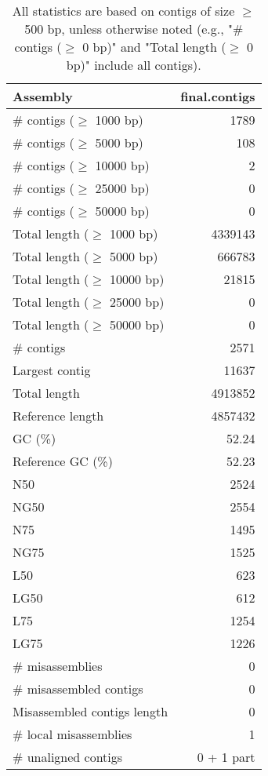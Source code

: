 \documentclass[12pt,a4paper]{article}
\begin{document}
\begin{table}[ht]
\begin{center}
\caption{All statistics are based on contigs of size $\geq$ 500 bp, unless otherwise noted (e.g., "\# contigs ($\geq$ 0 bp)" and "Total length ($\geq$ 0 bp)" include all contigs).}
\begin{tabular}{|l*{1}{|r}|}
\hline
Assembly & final.contigs \\ \hline
\# contigs ($\geq$ 1000 bp) & 1789 \\ \hline
\# contigs ($\geq$ 5000 bp) & 108 \\ \hline
\# contigs ($\geq$ 10000 bp) & 2 \\ \hline
\# contigs ($\geq$ 25000 bp) & 0 \\ \hline
\# contigs ($\geq$ 50000 bp) & 0 \\ \hline
Total length ($\geq$ 1000 bp) & 4339143 \\ \hline
Total length ($\geq$ 5000 bp) & 666783 \\ \hline
Total length ($\geq$ 10000 bp) & 21815 \\ \hline
Total length ($\geq$ 25000 bp) & 0 \\ \hline
Total length ($\geq$ 50000 bp) & 0 \\ \hline
\# contigs & 2571 \\ \hline
Largest contig & 11637 \\ \hline
Total length & 4913852 \\ \hline
Reference length & 4857432 \\ \hline
GC (\%) & 52.24 \\ \hline
Reference GC (\%) & 52.23 \\ \hline
N50 & 2524 \\ \hline
NG50 & 2554 \\ \hline
N75 & 1495 \\ \hline
NG75 & 1525 \\ \hline
L50 & 623 \\ \hline
LG50 & 612 \\ \hline
L75 & 1254 \\ \hline
LG75 & 1226 \\ \hline
\# misassemblies & 0 \\ \hline
\# misassembled contigs & 0 \\ \hline
Misassembled contigs length & 0 \\ \hline
\# local misassemblies & 1 \\ \hline
\# unaligned contigs & 0 + 1 part \\ \hline

\end{tabular}
\end{center}
\end{table}
\end{document}
